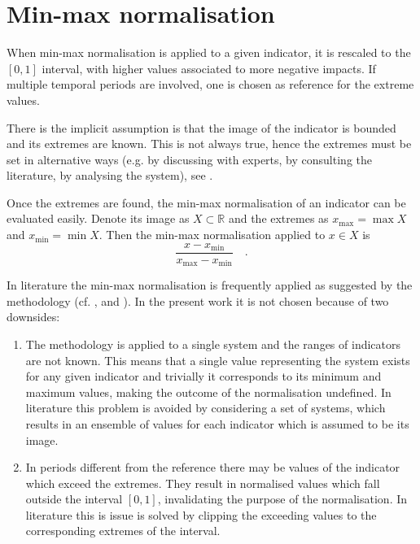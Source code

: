 \section{Min-max normalisation}
\label{sec:Min-max normalisation}
When min-max normalisation is applied to a given \gls{indicator}, it is rescaled to the $[0, 1]$ interval, with higher values associated to more negative \glspl{impact}. If multiple temporal periods are involved, one is chosen as reference for the extreme values.\cite[85]{2008OECDHandbookOn}

There is the implicit assumption is that the image of the \gls{indicator} is bounded and its extremes are known. This is not always true, hence the extremes must be set in alternative ways (e.g. by discussing with experts, by consulting the literature, by analysing the system), see \cite[113-115]{2017GIZTheVulnerability}.

Once the extremes are found, the min-max normalisation of an \gls{indicator} can be evaluated easily. Denote its image as $X \subset \mathbb{R}$ and the extremes as $x_\text{max} = \max X$ and $x_\text{min} = \min X$. Then the min-max normalisation applied to $x \in X$ is
\begin{equation}
  \label{eq:min-max}
  \frac{x - x_\text{min}}{x_\text{max} - x_\text{min}}
  \quad .
\end{equation}

In literature the min-max normalisation is frequently applied as suggested by the methodology (cf. \cite[6]{2023DeVivoApplicationOf}, \cite[6]{2023DeVivoClimate-RiskAssessment} and \cite[74]{2017GIZVulnerabilitySourcebook}). In the present work it is not chosen because of two downsides:
\begin{enumerate}
  \item The methodology is applied to a single system and the ranges of \glspl{indicator} are not known. This means that a single value representing the system exists for any given \gls{indicator} and trivially it corresponds to its minimum and maximum values, making the outcome of the normalisation undefined. In literature this problem is avoided by considering a set of systems, which results in an ensemble of values for each \gls{indicator} which is assumed to be its image.
  \item In periods different from the reference there may be values of the \gls{indicator} which exceed the extremes. They result in normalised values which fall outside the interval $[0, 1]$, invalidating the purpose of the normalisation. In literature this is issue is solved by clipping the exceeding values to the corresponding extremes of the interval.
\end{enumerate}



